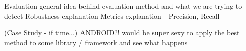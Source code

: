 
Evaluation
	general idea behind evaluation method and what we are trying to detect
	Robustness explanation
	Metrics explanation - Precision, Recall

	(Case Study - if time...)
		ANDROID?!
		would be super sexy to apply the best method to some library / framework and see what happens